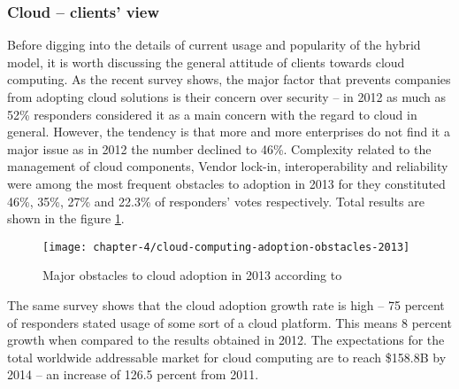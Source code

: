 \subsubsection*{Cloud -- clients' view}
Before digging into the details of current usage and popularity of the hybrid model, it is worth discussing the general attitude of clients towards cloud computing. As the recent survey \cite{NBSurvey13} shows, the major factor that prevents companies from adopting cloud solutions is their concern over security -- in 2012 as much as 52\% responders considered it as a main concern with the regard to cloud in general. However, the tendency is that more and more enterprises do not find it a major issue as in 2012 the number declined to 46\%.
Complexity related to the management of cloud components, Vendor lock-in, interoperability and reliability were among the most frequent obstacles to adoption in 2013 for they constituted 46\%, 35\%, 27\% and 22.3\% of responders' votes respectively. Total results are shown in the figure \ref{ch4:cloud-computing-adoption-obstacles-2013}.
\begin{figure}[!ht]
  \begin{center}
    \texttt{[image: chapter-4/cloud-computing-adoption-obstacles-2013]}
  \end{center}
  \caption{Major obstacles to cloud adoption in 2013 according to \cite{NBSurvey13}}
  \label{ch4:cloud-computing-adoption-obstacles-2013}
\end{figure}

The same survey shows that the cloud adoption growth rate is high -- 75 percent of responders stated usage of some sort of a cloud platform. This means 8 percent growth when compared to the results obtained in 2012. The expectations for the total worldwide addressable market for cloud computing are to reach \$158.8B by 2014 -- an increase of 126.5 percent from 2011.

